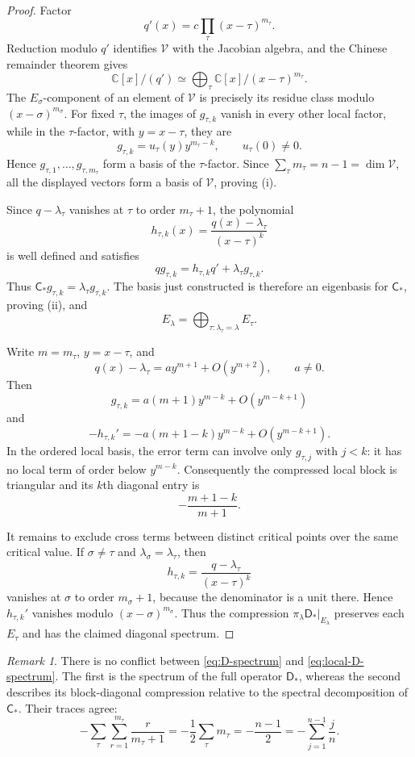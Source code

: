\documentclass[11pt]{article}
\numberwithin{equation}{section}
\theoremstyle{definition}
\theoremstyle{remark}
\newtheorem{remark}[remark]{Remark}
\newcommand{\C}{\mathbb C}
\newcommand{\Vcal}{\mathscr V}
\begin{document}
\begin{proof}
Factor
\[
  q'(x)=c\prod_\tau(x-\tau)^{m_\tau}.
\]
Reduction modulo $q'$ identifies $\Vcal$ with the Jacobian algebra, and the
Chinese remainder theorem gives
\[
  \C[x]/(q')
  \simeq
  \bigoplus_\tau\C[x]/(x-\tau)^{m_\tau}.
\]
The $E_\sigma$-component of an element of $\Vcal$ is precisely its residue
class modulo $(x-\sigma)^{m_\sigma}$.  For fixed $\tau$, the images of
$g_{\tau,k}$ vanish in every other local factor, while in the $\tau$-factor,
with $y=x-\tau$, they are
\[
  g_{\tau,k}=u_\tau(y)y^{m_\tau-k},
  \qquad u_\tau(0)\ne0.
\]
Hence $g_{\tau,1},\ldots,g_{\tau,m_\tau}$ form a basis of the $\tau$-factor.
Since $\sum_\tau m_\tau=n-1=\dim\Vcal$, all the displayed vectors form a
basis of $\Vcal$, proving (i).

Since $q-\lambda_\tau$ vanishes at $\tau$ to order $m_\tau+1$, the polynomial
\[
  h_{\tau,k}(x)=\frac{q(x)-\lambda_\tau}{(x-\tau)^k}
\]
is well defined and satisfies
\[
  qg_{\tau,k}=h_{\tau,k}q'+\lambda_\tau g_{\tau,k}.
\]
Thus $\mathsf C_*g_{\tau,k}=\lambda_\tau g_{\tau,k}$.  The basis just
constructed is therefore an eigenbasis for $\mathsf C_*$, proving (ii), and
\[
  E_\lambda=\bigoplus_{\tau:\lambda_\tau=\lambda}E_\tau.
\]

Write $m=m_\tau$, $y=x-\tau$, and
\[
  q(x)-\lambda_\tau=ay^{m+1}+O(y^{m+2}),
  \qquad a\ne0.
\]
Then
\[
  g_{\tau,k}=a(m+1)y^{m-k}+O(y^{m-k+1})
\]
and
\[
  -h_{\tau,k}'
  =-a(m+1-k)y^{m-k}+O(y^{m-k+1}).
\]
In the ordered local basis, the error term can involve only
$g_{\tau,j}$ with $j<k$: it has no local term of order below $y^{m-k}$.
Consequently the compressed local block is triangular and its $k$th diagonal
entry is
\[
  -\frac{m+1-k}{m+1}.
\]

It remains to exclude cross terms between distinct critical points over the
same critical value.  If $\sigma\ne\tau$ and
$\lambda_\sigma=\lambda_\tau$, then
\[
  h_{\tau,k}=\frac{q-\lambda_\tau}{(x-\tau)^k}
\]
vanishes at $\sigma$ to order $m_\sigma+1$, because the denominator is a unit
there.  Hence $h_{\tau,k}'$ vanishes modulo
$(x-\sigma)^{m_\sigma}$.  Thus the compression
$\pi_\lambda\mathsf D_*|_{E_\lambda}$ preserves each $E_\tau$ and has the
claimed diagonal spectrum.
\end{proof}

\begin{remark}\label{rem:full-vs-local-D}
There is no conflict between \eqref{eq:D-spectrum} and
\eqref{eq:local-D-spectrum}.  The first is the spectrum of the full operator
$\mathsf D_*$, whereas the second describes its block-diagonal compression
relative to the spectral decomposition of $\mathsf C_*$.  Their traces agree:
\[
  -\sum_\tau\sum_{r=1}^{m_\tau}\frac r{m_\tau+1}
  =-\frac12\sum_\tau m_\tau
  =-\frac{n-1}{2}
  =-\sum_{j=1}^{n-1}\frac jn.
\]
\end{remark}
\end{document}
